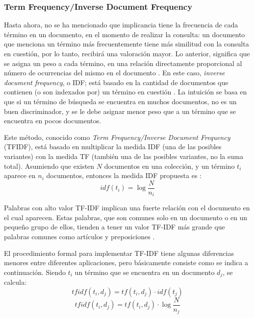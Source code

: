 \subsubsection{Term Frequency/Inverse Document Frequency}
Hasta ahora, no se ha mencionado que implicancia tiene la frecuencia de cada término en un documento, en el momento de realizar la consulta: un documento que menciona un término más frecuentemente tiene más similitud con la consulta en cuestión, por lo tanto, recibirá una valoración mayor. Lo anterior, significa que se asigna un peso a cada término, en una relación directamente proporcional al número de ocurrencias del mismo en el documento \citep{christopher2008introduction}. En este caso, \textit{inverse document frequency}, o IDF; está basado en la cantidad de documentos que contienen (o son indexados por) un término en cuestión \citep{robertson2004understanding}. La intuición se basa en que si un término de búsqueda se encuentra en muchos documentos, no es un buen discriminador, y se le debe asignar menor peso que a un término que se encuentra en pocos documentos.

\bigskip Este método, conocido como \textit{Term Frequency/Inverse Document Frequency} (TFIDF), está basado en multiplicar la medida IDF (una de las posibles variantes) con la medida TF (también una de las posibles variantes, no la suma total). Asumiendo que existen \(N\) documentos en una colección, y un término \(t_i\) aparece en \(n_i\) documentos, entonces la medida IDF propuesta es \citep{sparck1972statistical}:
\[idf(t_i) = \log{\frac{N}{n_i}}\]

Palabras con alto valor TF-IDF implican una fuerte relación con el documento en el cual aparecen. Estas palabras, que son comunes solo en un documento o en un pequeño grupo de ellos, tienden a tener un valor TF-IDF más grande que palabras comunes como artículos y preposiciones \citep{ramos2003using}.

\bigskip El procedimiento formal para implementar TF-IDF tiene algunas diferencias menores entre diferentes aplicaciones, pero básicamente consiste como se indica a continuación. Siendo \(t_i\) un término que se encuentra en un documento \(d_j\), se calcula:
\[tfidf(t_i, d_j) = tf(t_i, d_j) \cdot idf(t_j)\]
\[tfidf(t_i, d_j) = tf(t_i, d_j) \cdot \log{\frac{N}{n_j}}\]


